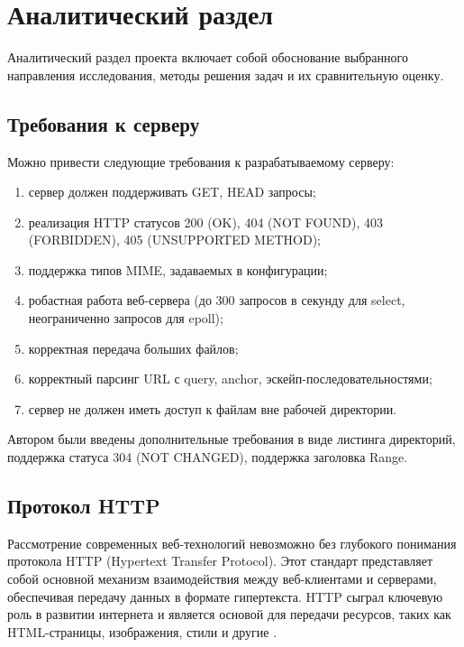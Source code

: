 \section{Аналитический раздел}


Аналитический раздел проекта включает собой обоснование выбранного направления исследования, методы решения задач и их сравнительную оценку.


\subsection{Требования к серверу}

Можно привести следующие требования к разрабатываемому серверу:
\begin{enumerate}[label={\arabic*)}]
    \item сервер должен поддерживать GET, HEAD запросы;
    \item реализация HTTP статусов 200 (OK), 404 (NOT FOUND), 403 (FORBIDDEN), 405 (UNSUPPORTED METHOD);
    \item поддержка типов MIME, задаваемых в конфигурации;
    \item робастная работа веб-сервера (до 300 запросов в секунду для select, неограниченно запросов для epoll);
    \item корректная передача больших файлов;
    \item корректный парсинг URL с query, anchor, эскейп-последовательностями;
    \item сервер не должен иметь доступ к файлам вне рабочей директории.
\end{enumerate}

Автором были введены дополнительные требования в виде листинга директорий, поддержка статуса 304 (NOT CHANGED), поддержка заголовка Range.

\subsection{Протокол HTTP}

Рассмотрение современных веб-технологий невозможно без глубокого понимания протокола HTTP (Hypertext Transfer Protocol). Этот стандарт представляет собой основной механизм взаимодействия между веб-клиентами и серверами, обеспечивая передачу данных в формате гипертекста. HTTP сыграл ключевую роль в развитии интернета и является основой для передачи ресурсов, таких как HTML-страницы, изображения, стили и другие \cite{nets1}.

